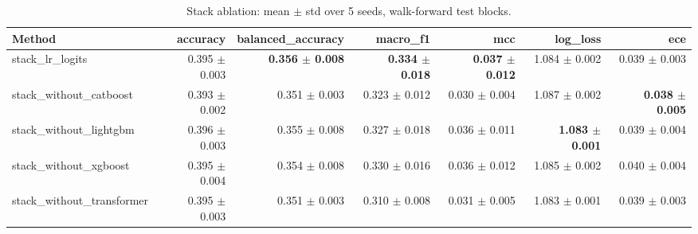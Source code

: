 \begin{table}[t]
\centering
\scriptsize
\caption{Stack ablation: mean $\pm$ std over 5 seeds, walk-forward test blocks.}
\label{tab:stack_ablation}
\begin{tabular}{lrrrrrr}
\toprule
Method & accuracy & balanced\_accuracy & macro\_f1 & mcc & log\_loss & ece \\
\midrule
stack\_lr\_logits & 0.395 $\pm$ 0.003 & \textbf{0.356 $\pm$ 0.008} & \textbf{0.334 $\pm$ 0.018} & \textbf{0.037 $\pm$ 0.012} & 1.084 $\pm$ 0.002 & 0.039 $\pm$ 0.003 \\
stack\_without\_catboost & 0.393 $\pm$ 0.002 & 0.351 $\pm$ 0.003 & 0.323 $\pm$ 0.012 & 0.030 $\pm$ 0.004 & 1.087 $\pm$ 0.002 & \textbf{0.038 $\pm$ 0.005} \\
stack\_without\_lightgbm & 0.396 $\pm$ 0.003 & 0.355 $\pm$ 0.008 & 0.327 $\pm$ 0.018 & 0.036 $\pm$ 0.011 & \textbf{1.083 $\pm$ 0.001} & 0.039 $\pm$ 0.004 \\
stack\_without\_xgboost & 0.395 $\pm$ 0.004 & 0.354 $\pm$ 0.008 & 0.330 $\pm$ 0.016 & 0.036 $\pm$ 0.012 & 1.085 $\pm$ 0.002 & 0.040 $\pm$ 0.004 \\
stack\_without\_transformer & 0.395 $\pm$ 0.003 & 0.351 $\pm$ 0.003 & 0.310 $\pm$ 0.008 & 0.031 $\pm$ 0.005 & 1.083 $\pm$ 0.001 & 0.039 $\pm$ 0.003 \\
\bottomrule
\end{tabular}
\end{table}
